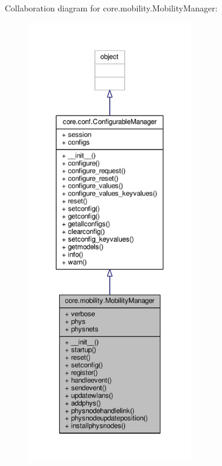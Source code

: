 Collaboration diagram for core.\+mobility.\+Mobility\+Manager\+:
\nopagebreak
\begin{figure}[H]
\begin{center}
\leavevmode
\includegraphics[height=550pt]{classcore_1_1mobility_1_1_mobility_manager__coll__graph}
\end{center}
\end{figure}
